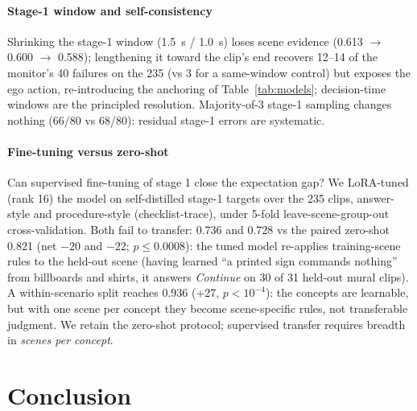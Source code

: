 \documentclass[conference]{IEEEtran}
\begin{document}
\paragraph{Stage-1 window and self-consistency} Shrinking the stage-1 window (1.5~s / 1.0~s) loses scene evidence (0.613 $\rightarrow$ 0.600 $\rightarrow$ 0.588); lengthening it toward the clip's end recovers 12--14 of the monitor's 40 failures on the 235 (vs 3 for a same-window control) but exposes the ego action, re-introducing the anchoring of Table~\ref{tab:models}; decision-time windows are the principled resolution. Majority-of-3 stage-1 sampling changes nothing (66/80 vs 68/80): residual stage-1 errors are systematic.

\paragraph{Fine-tuning versus zero-shot} Can supervised fine-tuning of stage 1 close the expectation gap? We LoRA-tuned (rank 16) the model on self-distilled stage-1 targets over the 235 clips, answer-style and procedure-style (checklist-trace), under 5-fold leave-scene-group-out cross-validation. Both fail to transfer: 0.736 and 0.728 vs the paired zero-shot 0.821 (net $-20$ and $-22$; $p \leq 0.0008$): the tuned model re-applies training-scene rules to the held-out scene (having learned ``a printed sign commands nothing'' from billboards and shirts, it answers \emph{Continue} on 30 of 31 held-out mural clips). A within-scenario split reaches 0.936 (+27, $p < 10^{-4}$): the concepts are learnable, but with one scene per concept they become scene-specific rules, not transferable judgment. We retain the zero-shot protocol; supervised transfer requires breadth in \emph{scenes per concept}.

\section{Conclusion}\label{sec:conclusion}
\end{document}
